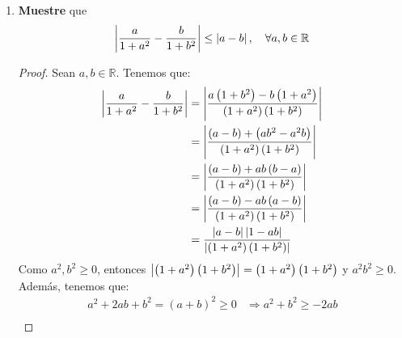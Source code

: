 \documentclass[12pt]{article}
\begin{document}
\begin{enumerate}
\begin{proof}
\begin{equation*}
                \begin{split}
                    b&>a\\
                    \Rightarrow b+b&>a+b\\
                    \Rightarrow 2b&>a+b\\
                    \Rightarrow b&>\frac{a+b}{2}
                \end{split}
            \end{equation*}
            Juntando las 3 desigualdades obtenemos lo deseado:
            \begin{equation*}
                b>\frac{a+b}{2}>\sqrt{ab}>a
            \end{equation*}
            \qed
        \end{proof}
    \item \textbf{Muestre} que
    \begin{equation*}
        \left| \frac{a}{1+a^2}-\frac{b}{1+b^2} \right| \leq \left| a-b \right|, \quad \forall a,b\in\mathbb{R}
    \end{equation*}
    \begin{proof}
        Sean $a,b\in\mathbb{R}$. Tenemos que:
        \begin{equation*}
            \begin{split}
                \left| \frac{a}{1+a^2}-\frac{b}{1+b^2} \right| &= \left| \frac{a\left(1+b^2\right)-b\left(1+a^2\right)}{\left(1+a^2\right)\left(1+b^2\right)} \right| \\
                &= \left| \frac{\left(a-b\right)+\left(ab^2-a^2b\right)}{\left(1+a^2\right)\left(1+b^2\right)} \right| \\
                &= \left| \frac{\left(a-b\right)+ab\left(b-a\right)}{\left(1+a^2\right)\left(1+b^2\right)} \right| \\
                &= \left| \frac{\left(a-b\right)-ab\left(a-b\right)}{\left(1+a^2\right)\left(1+b^2\right)} \right| \\
                &= \frac{\left| a-b \right|\left| 1-ab \right|}{\left| \left(1+a^2\right)\left(1+b^2\right) \right|} \\
            \end{split}
        \end{equation*}
        Como $a^2,b^2\geq0$, entonces $\left| \left(1+a^2\right)\left(1+b^2\right) \right|=\left(1+a^2\right)\left(1+b^2\right)$ y $a^2b^2\geq0$. Además, tenemos que:
        \begin{equation*}
            \begin{split}
                a^2+2ab+b^2 = \left(a+b\right)^2\geq0 &\Rightarrow a^2+b^2 \geq -2ab \\

\end{split}
\end{equation*}
\end{proof}
\end{enumerate}
\end{document}

